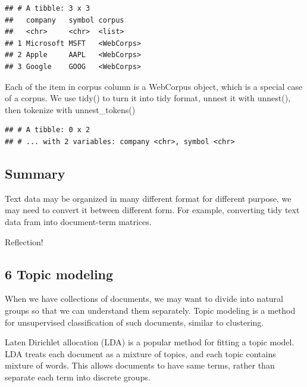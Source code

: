 \documentclass[]{article}
\newenvironment{Shaded}{\begin{snugshade}}{\end{snugshade}}
\newcommand{\DataTypeTok}[1]{\textcolor[rgb]{0.13,0.29,0.53}{#1}}
\newcommand{\KeywordTok}[1]{\textcolor[rgb]{0.13,0.29,0.53}{\textbf{#1}}}
\newcommand{\NormalTok}[1]{#1}
\newcommand{\OperatorTok}[1]{\textcolor[rgb]{0.81,0.36,0.00}{\textbf{#1}}}
\newcommand{\StringTok}[1]{\textcolor[rgb]{0.31,0.60,0.02}{#1}}
\begin{document}
\begin{verbatim}
## # A tibble: 3 x 3
##   company   symbol corpus    
##   <chr>     <chr>  <list>    
## 1 Microsoft MSFT   <WebCorps>
## 2 Apple     AAPL   <WebCorps>
## 3 Google    GOOG   <WebCorps>
\end{verbatim}

Each of the item in corpus column is a WebCorpus object, which is a
special case of a corpus. We use tidy() to turn it into tidy format,
unnest it with unnest(), then tokenize with unnest\_tokens()

\begin{Shaded}
\end{Shaded}

\begin{verbatim}
## # A tibble: 0 x 2
## # ... with 2 variables: company <chr>, symbol <chr>
\end{verbatim}

\hypertarget{summary}{%
\subsection{Summary}\label{summary}}

Text data may be organized in many different format for different
purpose, we may need to convert it between different form. For example,
converting tidy text data fram into document-term matrices.

Reflection!

\hypertarget{topic-modeling}{%
\subsection{6 Topic modeling}\label{topic-modeling}}

When we have collections of documents, we may want to divide into
natural groups so that we can understand them separately. Topic modeling
is a method for unsupervised classification of such documents, similar
to clustering.

Laten Dirichlet allocation (LDA) is a popular method for fitting a topic
model. LDA treats each document as a mixture of topics, and each topic
contains mixture of words. This allows documents to have same terms,
rather than separate each term into discrete groups.
\end{document}
